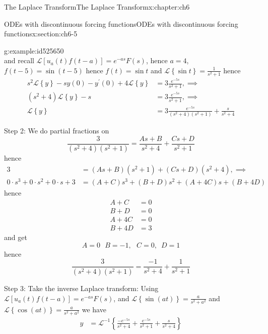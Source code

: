 \documentclass[oneside,10pt,]{book}
\numberwithin{equation}{section}
\numberwithin{equation}{section}
\newcommand{\amp}{&}
\begin{document}
\begin{chapterptx}{The Laplace Transform}{}{The Laplace Transform}{}{}{x:chapter:ch6}
\begin{sectionptx}{ODEs with discontinuous forcing functions}{}{ODEs with discontinuous forcing functions}{}{}{x:section:ch6-5}
\begin{example}{}{g:example:id525650}
\begin{equation*}
\end{equation*}
and recall \(\mathcal{L}\left[u_{a}(t)f(t-a)\right]=e^{-as}F(s)\), hence \(a=4\), \(f(t-5)=\sin\left(t-5\right)\) hence \(f(t)=\sin t\) and \(\mathcal{L}\left\{ \sin t\right\} =\frac{1}{s^{2}+1}\) hence%
\begin{align*}
s^{2}\mathcal{L}\left\{ y\right\} -sy(0)-y^{\prime}(0)+4\mathcal{L}\left\{ y\right\}  \amp =3\frac{e^{-5s}}{s^{2}+1},\implies\\
\left(s^{2}+4\right)\mathcal{L}\left\{ y\right\} -s \amp =3\frac{e^{-5s}}{s^{2}+1},\implies\\
\mathcal{L}\left\{ y\right\}  \amp =3\frac{e^{-5s}}{\left(s^{2}+4\right)\left(s^{2}+1\right)}+\frac{s}{s^{2}+4}
\end{align*}
%
\par
Step 2: We do partial fractions on%
\begin{equation*}
\frac{3}{\left(s^{2}+4\right)\left(s^{2}+1\right)}=\frac{As+B}{s^{2}+4}+\frac{Cs+D}{s^{2}+1}
\end{equation*}
hence%
\begin{align*}
3 \amp =\left(As+B\right)\left(s^{2}+1\right)+\left(Cs+D\right)\left(s^{2}+4\right),\implies\\
0\cdot s^{3}+0\cdot s^{2}+0\cdot s+3 \amp =\left(A+C\right)s^{3}+\left(B+D\right)s^{2}+\left(A+4C\right)s+\left(B+4D\right)
\end{align*}
hence%
\begin{align*}
A+C \amp =0\\
B+D \amp =0\\
A+4C \amp =0\\
B+4D \amp =3
\end{align*}
and get%
\begin{equation*}
A=0\,\,\,\,B=-1,\,\,\,\,C=0,\,\,\,D=1
\end{equation*}
hence%
\begin{equation*}
\frac{3}{\left(s^{2}+4\right)\left(s^{2}+1\right)}=\frac{-1}{s^{2}+4}+\frac{1}{s^{2}+1}
\end{equation*}
%
\par
Step 3: Take the inverse Laplace transform: Using \(\mathcal{L}\left[u_{a}(t)f(t-a)\right]=e^{-as}F(s)\), and \(\mathcal{L}\left\{ \sin(at)\right\} =\frac{a}{s^{2}+a^{2}}\) and \(\mathcal{L}\left\{ \cos(at)\right\} =\frac{a}{s^{2}+a^{2}}\) we have%
\begin{align*}
y \amp =\mathcal{L}^{-1}\left\{ \frac{-e^{-5s}}{s^{2}+4}+\frac{e^{-5s}}{s^{2}+1}+\frac{s}{s^{2}+4}\right\} \\

\end{align*}
\end{example}
\end{sectionptx}
\end{chapterptx}
\end{document}
